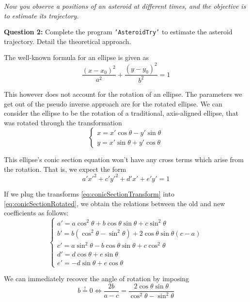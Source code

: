 \textit{Now you observe a positions of an asteroid at different times, and the objective is to estimate its trajectory.}

\textbf{Question 2:} Complete the program \texttt{'AsteroidTry'} to estimate the asteroid trajectory. Detail the theoretical approach.

The well-known formula for an ellipse is given as
\begin{equation}
    \frac{(x - x_0)^2}{a^2} + \frac{(y - y_0)^2}{b^2} = 1
\end{equation}

This however does not account for the rotation of an ellipse. The parameters we get out of the pseudo inverse approach are for the rotated ellipse. We can consider the ellipse to be the rotation of a traditional, axis-aligned ellipse, that was rotated through the transformation
\begin{equation}
    \begin{cases}
        x = x'\cos\theta - y'\sin\theta \\
        y = x'\sin\theta + y'\cos\theta
    \end{cases}
    \label{eq:conicSectionTransform}
\end{equation}

This ellipse's conic section equation won't have any cross terms which arise from the rotation. That is, we expect the form
\begin{equation}
    a'x'^2 + c'y'^2 + d'x' + e'y' = 1
    \label{eq:conicSectionUnrotated}
\end{equation}

If we plug the transforms \autoref{eq:conicSectionTransform} into \autoref{eq:conicSectionRotated}, we obtain the relations between the old and new coefficients as follows:
\begin{equation}
    \begin{cases}
        a' = a \cos^2\theta + b \cos\theta\sin\theta + c\sin^2\theta \\
        b' = b (\cos^2\theta - \sin^2\theta) + 2\cos\theta\sin\theta (c-a) \\
        c' = a \sin^2\theta - b \cos\theta\sin\theta + c\cos^2\theta \\
        d' = d\cos\theta + e\sin\theta \\
        e' = -d\sin\theta + e\cos\theta 
    \end{cases}
\end{equation}

We can immediately recover the angle of rotation by imposing
\begin{equation}
    b \overset{!}{=} 0 \Leftrightarrow \frac{2b}{a - c} = \frac{2\cos\theta\sin\theta}{\cos^2\theta - \sin^2\theta}
\end{equation}

